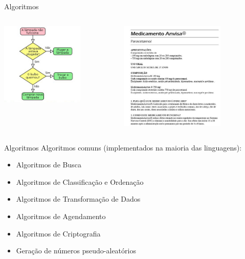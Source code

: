 \documentclass{beamer}
\begin{document}
\begin{frame}{Algoritmos}
\begin{columns}
	\begin{column}{0.5\textwidth}
		\centering
		\includegraphics[width=0.7\textwidth]{imagens/fluxograma-exemplo.jpg}
	\end{column}
	\begin{column}{0.5\textwidth}
		\centering
		\includegraphics[width=0.7\textwidth]{imagens/nao_e_algoritmo.jpg}
	\end{column}
\end{columns}
\end{frame}

\begin{frame}{Algoritmos}
	Algoritmos comuns (implementados na maioria das linguagens):
	\begin{itemize}
		\item Algoritmos de Busca
		\item Algoritmos de Classificação e Ordenação
		\item Algoritmos de Transformação de Dados
		\item Algoritmos de Agendamento
		\item Algoritmos de Criptografia
		\item Geração de números pseudo-aleatórios
	\end{itemize}
\end{frame}
\end{document}
